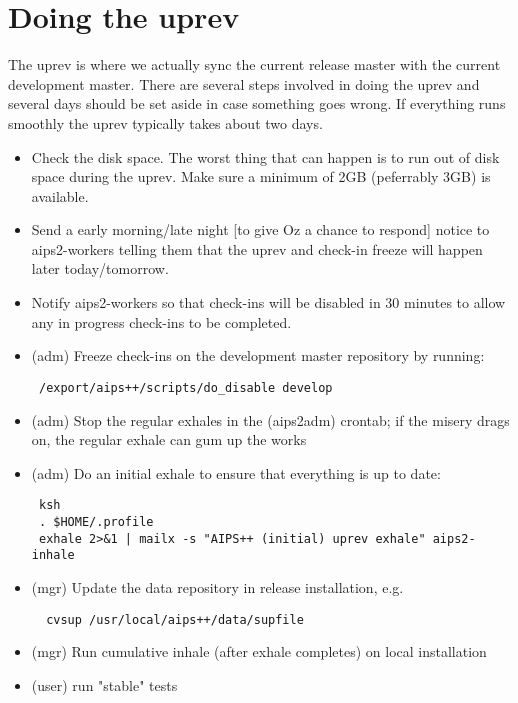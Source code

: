 \section{Doing the uprev}
The uprev is where we actually sync the current release master with the current development master.
There are several steps involved in doing the uprev and several days should be set aside in case
something goes wrong. If everything runs smoothly the uprev typically takes about two days.
\begin{itemize}
\item Check the disk space.  The worst thing that can happen is to run out of disk space during
the uprev.  Make sure a minimum of 2GB (peferrably 3GB) is available.
\item Send a early morning/late night [to give Oz a chance to respond] notice
   to aips2-workers telling them that the uprev and check-in freeze will happen
      later today/tomorrow. 

\item Notify aips2-workers so that check-ins will be disabled in 30 minutes to
         allow any in progress check-ins to be completed.

\item (adm) Freeze check-ins on the development master repository by running:
\begin{verbatim}
 /export/aips++/scripts/do_disable develop
\end{verbatim}

\item (adm) Stop the regular exhales in the (aips2adm) crontab; if the misery
	drags on, the regular exhale can gum up the works

\item (adm) Do an initial exhale to ensure that everything is up to date:
\begin{verbatim}
 ksh
 . $HOME/.profile
 exhale 2>&1 | mailx -s "AIPS++ (initial) uprev exhale" aips2-inhale
\end{verbatim}

\item (mgr) Update the data repository in release installation, e.g.
\begin{verbatim}
  cvsup /usr/local/aips++/data/supfile
\end{verbatim}

\item (mgr) Run cumulative inhale (after exhale completes) on local installation
\item (user) run "stable" tests


\end{itemize}
